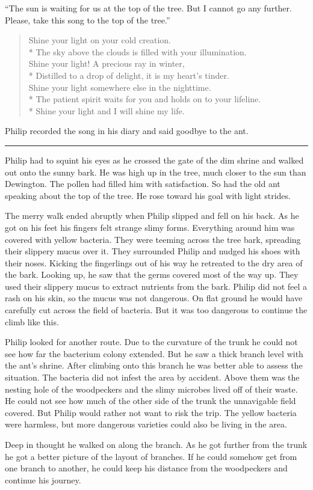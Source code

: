 \documentclass[10pt, draft]{memoir}
\renewcommand{\pfbreakdisplay}{\bigskip \ding{166} \bigskip}
\newcommand{\secbreak}{\fancybreak{\pfbreakdisplay}}
\newcommand{\sunsong}{
  Shine your light on your cold creation. \\*
  The sky above the clouds is filled with your illumination. \\
  Shine your light! A precious ray in winter, \\*
  Distilled to a drop of delight, it is my heart's tinder. \\
  Shine your light somewhere else in the nighttime. \\*
  The patient spirit waits for you and holds on to your lifeline. \\*
  Shine your light and I will shine my life.
}
\begin{document}
``The sun is waiting for us at the top of the tree. But I cannot go any
further. Please, take this song to the top of the tree.''


\begin{verse}
\sunsong
\end{verse}


Philip recorded the song in his diary and said goodbye to the ant.

\secbreak

Philip had to squint his eyes as he crossed the gate of the dim shrine and
walked out onto the sunny bark. He was high up in the tree, much closer to the
sun than Dewington. The pollen had filled him with satisfaction. So had the old
ant speaking about the top of the tree.  He rose toward his goal with light
strides.

The merry walk ended abruptly when Philip slipped and fell on his back. As he
got on his feet his fingers felt strange slimy forms. Everything around him was
covered with yellow bacteria. They were teeming across the tree bark, spreading
their slippery mucus over it. They surrounded Philip and nudged his shoes with
their noses. Kicking the fingerlings out of his way he retreated to the dry
area of the bark. Looking up, he saw that the germs covered most of the way up.
They used their slippery mucus to extract nutrients from the bark. Philip did
not feel a rash on his skin, so the mucus was not dangerous. On flat ground he
would have carefully cut across the field of bacteria. But it was too dangerous
to continue the climb like this.

Philip looked for another route. Due to the curvature of the trunk he could not
see how far the bacterium colony extended. But he saw a thick branch level with
the ant's shrine. After climbing onto this branch he was better able to assess
the situation. The bacteria did not infest the area by accident. Above them was
the nesting hole of the woodpeckers and the slimy microbes lived off of their
waste. He could not see how much of the other side of the trunk the unnavigable
field covered. But Philip would rather not want to risk the trip. The yellow
bacteria were harmless, but more dangerous varieties could also be living in
the area.

Deep in thought he walked on along the branch. As he got further from the trunk
he got a better picture of the layout of branches. If he could somehow get from
one branch to another, he could keep his distance from the woodpeckers and
continue his journey.
\end{document}
